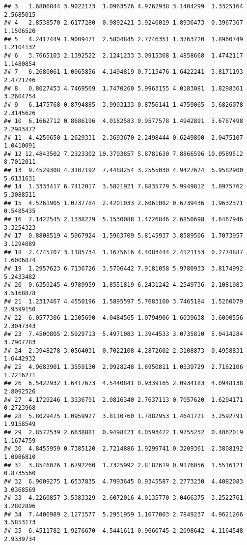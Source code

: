 \documentclass[
]{article}
\begin{document}
\begin{verbatim}
## 3   1.6806844 3.9022173  1.0963576 4.9762938 3.1404299  1.3325164 2.5685015
## 4   2.8538570 2.6177280  0.9892421 3.9246019 1.8936473  0.3967367 1.1506520
## 5   4.2417449 1.9009471  2.5804845 2.7746351 1.3763720  1.8960749 1.2104132
## 6   3.7665103 2.1392522  2.1241233 3.0915368 1.4858668  1.4742117 1.1480854
## 7   6.2680061 1.0965856  4.1494819 0.7115476 1.6422241  3.8171193 2.4721246
## 8   0.8027453 4.7469569  1.7470260 5.9963155 4.0183081  1.8298361 3.2604754
## 9   6.1475768 0.8794885  3.9903133 0.8756141 1.4759065  3.6826078 2.3145626
## 10  6.1662712 0.8686196  4.0182583 0.9577578 1.4942891  3.6787498 2.2983472
## 11  4.4250650 1.2629331  2.3693670 2.2498444 0.6249800  2.0475107 1.0410091
## 12 12.4843502 7.2323302 10.3703857 5.8781630 7.8866596 10.0589512 8.7012011
## 13  9.4529308 4.3107192  7.4488254 3.2555030 4.9427624  6.9582900 5.6131631
## 14  1.3333417 6.7412017  3.5821921 7.8835779 5.9949812  3.8975762 5.3088511
## 15  4.5261905 1.0737784  2.4201033 2.6061082 0.6739436  1.9632371 0.5485435
## 16  7.1422545 2.1338229  5.1530088 1.4726846 2.6850698  4.6467946 3.3254323
## 17  0.8808519 4.5967924  1.5963709 5.8145937 3.8589506  1.7073957 3.1294089
## 18  2.4745707 3.1185734  1.1675616 4.4083444 2.4121153  0.2774887 1.6006874
## 19  1.2957623 6.7136726  3.5706442 7.9181058 5.9780933  3.8174992 5.2433482
## 20  0.6359245 4.9789959  1.8551819 6.2431242 4.2549736  2.1081983 3.5168878
## 21  1.2317467 4.4550196  1.5895597 5.7683100 3.7465184  1.5260079 2.9399150
## 22  6.0577306 1.2305690  4.0484565 1.0794906 1.6039638  3.6000556 2.3047343
## 23  7.4500805 2.5929713  5.4971083 1.3944533 3.0735810  5.0414284 3.7907783
## 24  2.3948278 3.0564031  0.7022108 4.2872602 2.3108873  0.4958831 1.6442932
## 25  4.9683901 1.3559130  2.9928248 1.6950811 1.0339729  2.7162106 1.7216271
## 26  6.5422932 1.6417673  4.5440841 0.9339165 2.0934183  4.0948138 2.8092526
## 27  4.1729246 1.3336791  2.0816340 2.7637113 0.7057620  1.6294171 0.2723968
## 28  5.8029475 1.0959927  3.8110760 1.7882953 1.4641721  3.2592791 1.9158549
## 29  2.8572539 2.6638881  0.9498421 4.0593472 1.9755252  0.4062019 1.1674759
## 30  4.8455959 0.7385120  2.7214886 1.9299741 0.3209361  2.3808192 1.0986810
## 31  3.8546076 1.6792260  1.7325992 2.8182619 0.9176056  1.5516121 0.8735560
## 32  6.9009275 1.6537835  4.7993645 0.9345587 2.2773230  4.4082083 3.0368569
## 33  4.2260857 3.5383329  2.6072016 4.0135770 3.0466375  3.2522761 3.2802896
## 34  7.4406989 2.1271577  5.2951959 1.1077003 2.7849237  4.9621266 3.5853173
## 35  6.4511782 1.9276670  4.5441611 0.9660745 2.2098642  4.1164548 2.9339734

\end{verbatim}
\end{document}

